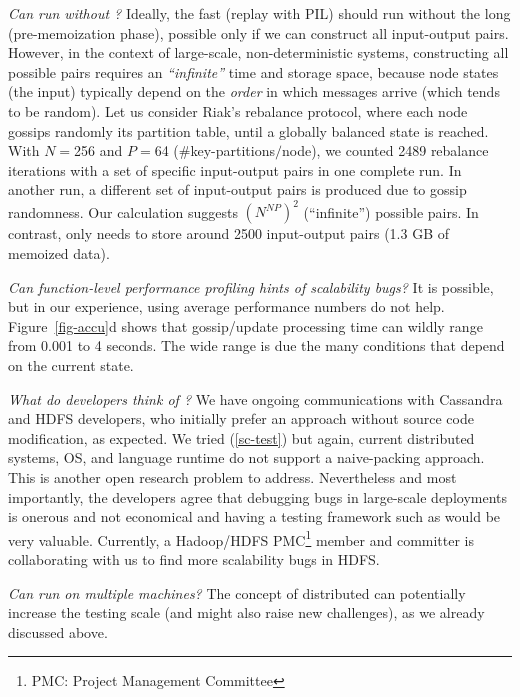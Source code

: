 {\em Can \stestp run without \stestm?}
%
Ideally, the fast \stestp (replay with PIL) should run without the long
\stestm (pre-memoization phase), possible only if we can construct all
input-output pairs.  However, in the context of large-scale,
non-deterministic systems, constructing all possible pairs requires an
{\em ``infinite''} time and storage space, because node states (the input)
typically depend on the {\em order} in which messages arrive (which tends
to be random).
%
Let us consider Riak's rebalance protocol, where each node gossips
randomly its partition table, until a globally balanced state is reached.
With $N$$=$256 and $P$$=$64 (\#key-partitions$/$node), we counted 2489
rebalance iterations with a set of specific input-output pairs in one
complete run.  In another run, a different set of input-output pairs is
produced due to gossip randomness.  Our calculation suggests $(N^{NP})^2$
(``infinite'') possible pairs.
%
In contrast, \stestm only needs to store around 2500 input-output pairs
(1.3 GB of memoized data).


{\em Can function-level performance profiling hints of scalability bugs?}
%
It is possible, but in our experience, using average performance numbers
do not help.  Figure~\ref{fig-accu}d shows that gossip/update processing
time can wildly range from 0.001 to 4 seconds.  The wide range is due
the many  conditions that depend on the current state.


{\em What do developers think of \sck?}  We have ongoing communications
with Cassandra and HDFS developers, who initially prefer an approach
without source code modification, as expected.  We tried
(\sec\ref{sc-test}) but again, current distributed systems, OS, and
language runtime do not support a naive-packing approach.  This is another
open research problem to address.
%
Nevertheless and most importantly, the developers agree that debugging
bugs in large-scale deployments is onerous and not economical and having a
testing framework such as \sck would be very valuable.
%
Currently, a Hadoop/HDFS PMC\footnote{PMC: Project Management Committee} member
and committer is collaborating with us to find more scalability bugs in HDFS.



{\em Can \sck run on multiple machines?}  The concept of distributed \sck
can potentially increase the testing scale (and might also raise new
challenges), as we already discussed above.


